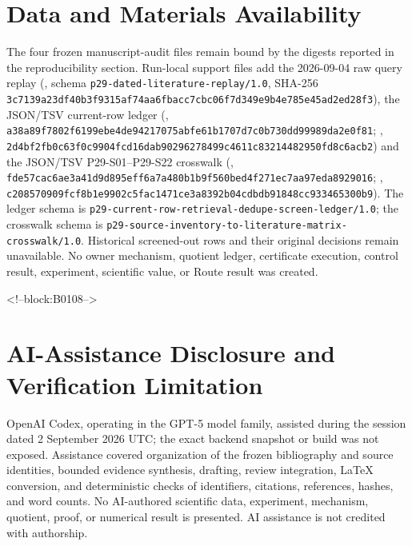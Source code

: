 \documentclass[11pt,a4paper]{article}
\begin{document}
\section*{Data and Materials Availability}
The four frozen manuscript-audit files remain bound by the digests reported in the reproducibility section. Run-local support files add the 2026-09-04 raw query replay (, schema \texttt{p29-dated-literature-replay/1.0}, SHA-256 \texttt{3c7139a2\allowbreak{}3df40b3f\allowbreak{}9315af74\allowbreak{}aa6fbacc\allowbreak{}7cbc06f7\allowbreak{}d349e9b4\allowbreak{}e785e45a\allowbreak{}d2ed28f3}), the JSON/TSV current-row ledger (, \texttt{a38a89f7\allowbreak{}802f6199\allowbreak{}ebe4de94\allowbreak{}217075ab\allowbreak{}fe61b170\allowbreak{}7d7c0b73\allowbreak{}0dd99989\allowbreak{}da2e0f81}; , \texttt{2d4bf2fb\allowbreak{}0c63f0c9\allowbreak{}904fcd16\allowbreak{}dab90296\allowbreak{}278499c4\allowbreak{}611c8321\allowbreak{}4482950f\allowbreak{}d8c6acb2}) and the JSON/TSV P29-S01--P29-S22 crosswalk (, \texttt{fde57cac\allowbreak{}6ae3a41d\allowbreak{}9d895eff\allowbreak{}6a7a480b\allowbreak{}1b9f560b\allowbreak{}ed4f271e\allowbreak{}c7aa97ed\allowbreak{}a8929016}; , \texttt{c2085709\allowbreak{}09fcf8b1\allowbreak{}e9902c5f\allowbreak{}ac1471ce\allowbreak{}3a8392b0\allowbreak{}4cdbdb91\allowbreak{}848cc933\allowbreak{}465300b9}). The ledger schema is \texttt{p29-current-row-retrieval-dedupe-screen-ledger/1.0}; the crosswalk schema is \texttt{p29-source-inventory-to-literature-matrix-crosswalk/1.0}. Historical screened-out rows and their original decisions remain unavailable. No owner mechanism, quotient ledger, certificate execution, control result, experiment, scientific value, or Route result was created.

<!--block:B0108-->
\section*{AI-Assistance Disclosure and Verification Limitation}
OpenAI Codex, operating in the GPT-5 model family, assisted during the session dated 2 September 2026 UTC; the exact backend snapshot or build was not exposed. Assistance covered organization of the frozen bibliography and source identities, bounded evidence synthesis, drafting, review integration, LaTeX conversion, and deterministic checks of identifiers, citations, references, hashes, and word counts. No AI-authored scientific data, experiment, mechanism, quotient, proof, or numerical result is presented. AI assistance is not credited with authorship.
\end{document}
